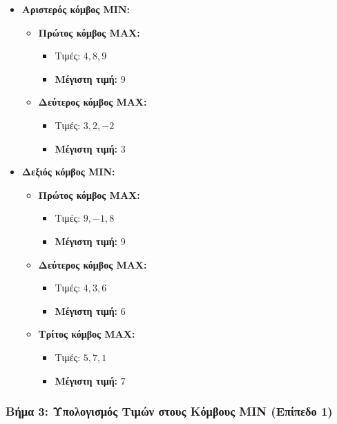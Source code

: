 \documentclass{article}
\begin{document}
\begin{itemize}
    \item \textbf{Αριστερός κόμβος MIN:}
    \begin{itemize}
        \item \textbf{Πρώτος κόμβος MAX:}
        \begin{itemize}
            \item Τιμές: \(4, 8, 9\)
            \item \textbf{Μέγιστη τιμή:} \(9\)
        \end{itemize}
        \item \textbf{Δεύτερος κόμβος MAX:}
        \begin{itemize}
            \item Τιμές: \(3, 2, -2\)
            \item \textbf{Μέγιστη τιμή:} \(3\)
        \end{itemize}
    \end{itemize}
    \item \textbf{Δεξιός κόμβος MIN:}
    \begin{itemize}
        \item \textbf{Πρώτος κόμβος MAX:}
        \begin{itemize}
            \item Τιμές: \(9, -1, 8\)
            \item \textbf{Μέγιστη τιμή:} \(9\)
        \end{itemize}
        \item \textbf{Δεύτερος κόμβος MAX:}
        \begin{itemize}
            \item Τιμές: \(4, 3, 6\)
            \item \textbf{Μέγιστη τιμή:} \(6\)
        \end{itemize}
        \item \textbf{Τρίτος κόμβος MAX:}
        \begin{itemize}
            \item Τιμές: \(5, 7, 1\)
            \item \textbf{Μέγιστη τιμή:} \(7\)
        \end{itemize}
    \end{itemize}
\end{itemize}

\subsubsection*{Βήμα 3: Υπολογισμός Τιμών στους Κόμβους MIN (Επίπεδο 1)}
\end{document}
